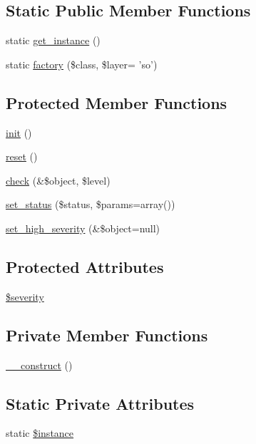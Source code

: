 \subsection*{Static Public Member Functions}
\begin{DoxyCompactItemize}
\item 
static \hyperlink{classOWL_ae75b698b8f0aa7f9106ce84744ff10ed}{get\_\-instance} ()
\item 
static \hyperlink{classOWL_aa6f4f99b9b0d6c77e7d49075d8a29d69}{factory} (\$class, \$layer= 'so')
\end{DoxyCompactItemize}
\subsection*{Protected Member Functions}
\begin{DoxyCompactItemize}
\item 
\hyperlink{class__OWL_ae0ef3ded56e8a6b34b6461e5a721cd3e}{init} ()
\item 
\hyperlink{class__OWL_a2f2a042bcf31965194c03033df0edc9b}{reset} ()
\item 
\hyperlink{class__OWL_ad6f4f6946f40199dd0333cf219fa500e}{check} (\&\$object, \$level)
\item 
\hyperlink{class__OWL_aea912d0ede9b3c2a69b79072d94d4787}{set\_\-status} (\$status, \$params=array())
\item 
\hyperlink{class__OWL_a576829692a3b66e3d518853bf43abae3}{set\_\-high\_\-severity} (\&\$object=null)
\end{DoxyCompactItemize}
\subsection*{Protected Attributes}
\begin{DoxyCompactItemize}
\item 
\hyperlink{class__OWL_ad26b40a9dbbacb33e299b17826f8327c}{\$severity}
\end{DoxyCompactItemize}
\subsection*{Private Member Functions}
\begin{DoxyCompactItemize}
\item 
\hyperlink{classOWL_a9240437570d0787f35b7a1102ee39cc6}{\_\-\_\-construct} ()
\end{DoxyCompactItemize}
\subsection*{Static Private Attributes}
\begin{DoxyCompactItemize}
\item 
static \hyperlink{classOWL_a0cb39c7fa9a2bd2e7d5b8ef6d7e81fa4}{\$instance}
\end{DoxyCompactItemize}


